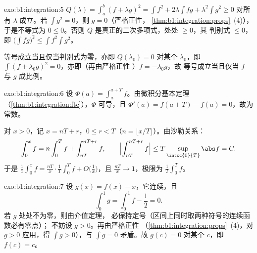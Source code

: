 \begin{solution}{exo:b1:integration:5}
$Q(\lambda) = \int_a^b (f + \lambda g)^2 = \int f^2 + 2\lambda \int
fg + \lambda^2 \int g^2 \geq 0$ 对所有 $\lambda$ 成立。若 $\int g^2 =
0$，则 $g = 0$（严格正性，
\cref{thm:b1:integration:props}~(4)），于是不等式为 $0 \leq
0$。否则 $Q$ 是真正的二次多项式，处处 $\geq 0$，其
判别式 $\leq 0$，即 $\bigl(\int fg\bigr)^2 \leq \int
f^2 \int g^2$。

等号成立当且仅当判别式为零，亦即 $Q(\lambda_0) = 0$ 对某个
$\lambda_0$，即 $\int (f + \lambda_0 g)^2 = 0$，亦即（再由严格正性
）$f = -\lambda_0 g$，故
等号成立当且仅当 $f$ 与 $g$ 成比例。
\end{solution}

\begin{solution}{exo:b1:integration:6}
设 $\Phi(a) = \int_a^{a+T} f$。由微积分基本定理
（\cref{thm:b1:integration:ftc}），$\Phi$ 可导，且
$\Phi'(a) = f(a + T) - f(a) = 0$，故为常数。

对 $x > 0$，记 $x = nT + r$，$0 \leq r < T$（$n = \lfloor x/T
\rfloor$）。由沙勒关系：
\[
\int_0^x f = n \int_0^T f + \int_{nT}^{nT + r} f,
\qquad
\Bigl| \int_{nT}^{nT+r} f \Bigr| \leq T \sup_{\intcc{0}{T}} \abs f
= C .
\]
于是 $\frac 1x \int_0^x f = \frac{nT}{x}\cdot\frac 1T \int_0^T f +
O\bigl(\frac 1x\bigr)$，且 $\frac{nT}{x} \to 1$，极限为
$\frac1T \int_0^T f$。
\end{solution}

\begin{solution}{exo:b1:integration:7}
设 $g(x) = f(x) - x$，它连续，且
\[
\int_0^1 g = \int_0^1 f - \frac12 = 0 .
\]
若 $g$ 处处不为零，则由介值定理，
必保持定号（区间上同时取两种符号的连续函数必有零点）；
不妨设 $g > 0$。再由严格正性
（\cref{thm:b1:integration:props}~(4)，对 $g > 0$ 应用，得
$\int g > 0$），与 $\int g = 0$ 矛盾。故 $g(c) = 0$ 对某个
$c$，即 $f(c) = c$。
\end{solution}

